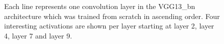 \begin{figure}[H]
\centering
\caption{Each line represents one convolution layer in the VGG13\_bn architecture which was trained from scratch in ascending order. Four interesting activations are shown per layer starting at layer 2, layer 4, layer 7 and layer 9.}


\end{figure}
